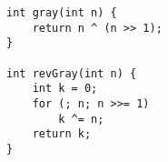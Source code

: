 \begin{verbatim}
int gray(int n) {
	return n ^ (n >> 1);
}

int revGray(int n) {
	int k = 0;
	for (; n; n >>= 1)
		k ^= n;
	return k;
}
\end{verbatim}
